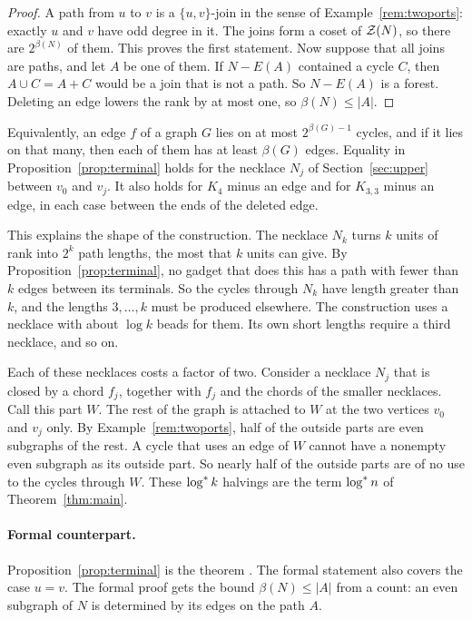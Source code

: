 \begin{proof}
A path from $u$ to $v$ is a $\{u,v\}$-join in the sense of Example~\ref{rem:twoports}: exactly $u$
and $v$ have odd degree in it. The joins form a coset of $\mathcal{Z}(N)$, so there are $2^{\beta(N)}$ of
them. This proves the first statement. Now suppose that all joins are paths, and let $A$ be one of
them. If $N-E(A)$ contained a cycle $C$, then $A\cup C=A+C$ would be a join that is not a path. So
$N-E(A)$ is a forest. Deleting an edge lowers the rank by at most one, so $\beta(N)\le|A|$.
\end{proof}

Equivalently, an edge $f$ of a graph $G$ lies on at most $2^{\beta(G)-1}$ cycles, and if it lies on
that many, then each of them has at least $\beta(G)$ edges. Equality in
Proposition~\ref{prop:terminal} holds for the necklace $N_j$ of Section~\ref{sec:upper} between
$v_0$ and $v_j$. It also holds for $K_4$ minus an edge and for $K_{3,3}$ minus an edge, in each case
between the ends of the deleted edge.

This explains the shape of the construction. The necklace $N_k$ turns $k$ units of rank into
$2^{k}$ path lengths, the most that $k$ units can give. By Proposition~\ref{prop:terminal}, no
gadget that does this has a path with fewer than $k$ edges between its terminals. So the cycles
through $N_k$ have length greater than $k$, and the lengths $3,\dots,k$ must be produced elsewhere.
The construction uses a necklace with about $\log k$ beads for them. Its own short lengths require
a third necklace, and so on.

Each of these necklaces costs a factor of two. Consider a necklace $N_j$ that is closed by a chord
$f_j$, together with $f_j$ and the chords of the smaller necklaces. Call this part $W$. The rest of
the graph is attached to $W$ at the two vertices $v_0$ and $v_j$ only. By
Example~\ref{rem:twoports}, half of the outside parts are even subgraphs of the rest. A cycle that
uses an edge of $W$ cannot have a nonempty even subgraph as its outside part. So nearly half of the
outside parts are of no use to the cycles through $W$. These $\log^{*} k$ halvings are the term
$\log^{*} n$ of Theorem~\ref{thm:main}.

\paragraph{Formal counterpart.}
Proposition~\ref{prop:terminal} is the theorem . The formal statement also
covers the case $u=v$. The formal proof gets the bound $\beta(N)\le|A|$ from a count: an even
subgraph of $N$ is determined by its edges on the path $A$.

